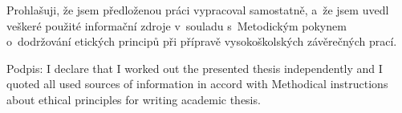 \startDeclaration
\ifCzech
  Prohlašuji, že jsem předloženou práci vypracoval samostatně,
  a~že jsem uvedl veškeré použité informační zdroje v~souladu
  s~Metodickým pokynem o~dodržování etických principů při přípravě
  vysokoškolských závěrečných prací.
	
	Podpis:
\fi
\ifEnglish
  I declare that I worked out the presented thesis independently
  and I quoted all used sources of information in accord with
  Methodical instructions about ethical principles for writing
  academic thesis.
\fi
\stopDeclaration

\endinput
